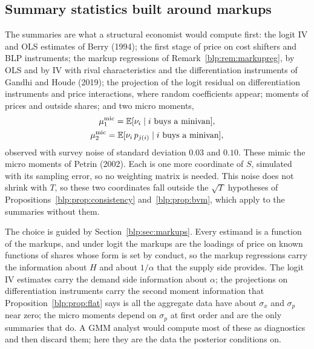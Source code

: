 \subsection{Summary statistics built around markups}
The summaries are what a structural economist would compute first: the logit IV and OLS
estimates of Berry (1994); the first stage of price on cost shifters and BLP instruments; the
markup regressions of Remark~\ref{blp:rem:markupreg}, by OLS and by IV with rival characteristics and the differentiation
instruments of Gandhi and Houde (2019); the projection of the logit residual on differentiation
instruments and price interactions, where random coefficients appear; moments of prices and outside
shares; and two micro moments,
\[
\begin{gathered}
  \mu^{\mathrm{mic}}_1 = \mathbb{E}[\nu_i \mid i \text{ buys a minivan}],\\
  \mu^{\mathrm{mic}}_2 = \mathbb{E}[\nu_i\, p_{j(i)} \mid i \text{ buys a minivan}],
\end{gathered}
\]
observed with survey noise of standard deviation $0.03$ and $0.10$. These mimic the micro moments of Petrin (2002). Each is one more coordinate of $S$, simulated with its sampling error, so no weighting matrix is needed. This noise does not shrink with $T$, so these two coordinates fall outside the $\sqrt T$ hypotheses of Propositions~\ref{blp:prop:consistency} and~\ref{blp:prop:bvm}, which apply to the summaries without them.

The choice is guided by Section~\ref{blp:sec:markups}. Every estimand is a function of the markups, and under logit the markups are the loadings of price on known functions of shares whose form is set by conduct, so the markup regressions carry the information about $H$ and about $1/\alpha$ that the supply side provides. The logit IV estimates carry the demand side information about $\alpha$; the projections on differentiation instruments carry the second moment information that Proposition~\ref{blp:prop:flat} says is all the aggregate data have about $\sigma_x$ and $\sigma_p$ near zero; the micro moments depend on $\sigma_p$ at first order and are the only summaries that do. A GMM analyst would compute most of these as diagnostics and then discard them; here they are the data the posterior conditions on.

